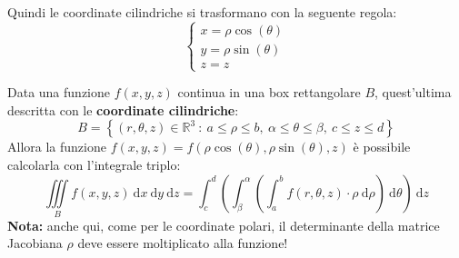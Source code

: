 \documentclass[a4paper]{article}
\newcommand{\definition}[1]{\textcolor{Red3}{\textbf{#1}}}
\begin{document}
	\noindent
	Quindi le coordinate cilindriche si trasformano con la seguente regola:
	\begin{equation}\label{eq: conversione in coordinate cilindriche}
		\begin{cases}
			x = \rho \cos\left(\theta\right) \\
			y = \rho \sin\left(\theta\right) \\
			z = z
		\end{cases}
	\end{equation}

	\begin{boxdef}
		Data una funzione $f\left(x,y,z\right)$ continua in una box rettangolare $B$, quest'ultima descritta con le \definition{coordinate cilindriche}:
		\begin{equation}
			B = \left\{\left(r, \theta, z\right) \in \mathbb{R}^{3} \: : \: a \le \rho \le b, \: \alpha \le \theta \le \beta, \: c \le z \le d\right\}
		\end{equation}
		Allora la funzione $f\left(x,y,z\right) = f\left(\rho\cos\left(\theta\right), \rho\sin\left(\theta\right), z\right)$ è possibile calcolarla con l'integrale triplo:
		\begin{equation}\label{eq: integrale triplo - coordinate cilindriche}
			\displaystyle\iiint\limits_{B} f\left(x,y,z\right) \:\mathrm{d}x\:\mathrm{d}y\:\mathrm{d}z
			=
			\displaystyle\int_{c}^{d} \left(\int_{\beta}^{\alpha} \left(\int_{a}^{b} f\left(r,\theta, z\right) \cdot \rho \:\mathrm{d}\rho\right) \:\mathrm{d}\theta\right) \:\mathrm{d}z
		\end{equation}
		\textbf{Nota:} anche qui, come per le coordinate polari, il determinante della matrice Jacobiana $\rho$ deve essere moltiplicato alla funzione!
	\end{boxdef}
\end{document}
